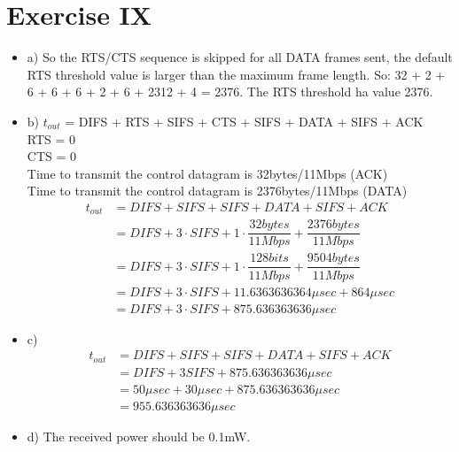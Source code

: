 \documentclass[11pt]{article}
\begin{document}
	\section*{Exercise IX}
	\begin{itemize}
		\item{a)} So the RTS/CTS sequence is skipped for all DATA frames sent, the default RTS threshold value is larger than the maximum frame length. So:
		32 + 2 + 6 + 6 + 6 + 2 + 6 + 2312 + 4 = 2376. The RTS threshold ha value 2376.
		\item{b)}
		$t_{out}$ = DIFS + RTS + SIFS + CTS + SIFS + DATA + SIFS + ACK \\
		RTS = 0\\
		CTS = 0\\
		Time to transmit the control datagram is 32bytes/11Mbps (ACK)\\
		Time to transmit the control datagram is 2376bytes/11Mbps (DATA)\\
		$$
		\begin{aligned}
			t_{out} &= DIFS  + SIFS  + SIFS + DATA + SIFS + ACK \\
			&= DIFS + 3 \cdot SIFS + 1 \cdot \dfrac{32 bytes}{11 Mbps} + \dfrac{2376 bytes}{11 Mbps}\\
			&= DIFS + 3 \cdot  SIFS + 1 \cdot \dfrac{128 bits}{11 Mbps} + \dfrac{9504 bytes}{11 Mbps}\\
			&= DIFS + 3 \cdot SIFS + 11.6363636364 \mu sec + 864 \mu sec\\
			&= DIFS + 3 \cdot SIFS + 875.636363636 \mu sec
		\end{aligned}
		$$
		\item{c)}
		$$
		\begin{aligned}
			t_{out} &= DIFS  + SIFS  + SIFS + DATA + SIFS + ACK \\
			&= DIFS + 3 SIFS + 875.636363636 \mu sec \\
			&= 50 \mu sec + 30 \mu sec + 875.636363636 \mu sec\\
			&= 955.636363636 \mu sec
		\end{aligned}
		$$
		\item{d)} The received power should be 0.1mW.
	\end{itemize}
\end{document}
